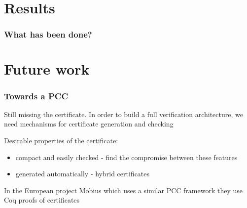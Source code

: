 \documentclass{beamer}
\begin{document}
 
\section{Results}

\begin{frame}\frametitle{What has been done?}
\begin{center}
\end{center}
\end{frame}


 \section{Future work}

\begin{frame}\frametitle{Towards  a PCC }
  Still missing the certificate. 
In order to build a full verification architecture,  we need mechanisms for certificate generation and checking

Desirable properties of the certificate:
                    \begin{itemize}
	                \item    compact and  easily checked - find the compromise between these features  
			  \item  generated automatically - hybrid certificates
		    \end{itemize}

In the European project Mobius which uses a similar PCC framework they 
			      use Coq proofs of certificates
		    

\begin{center}
\end{center}
\end{frame}
\end{document}
